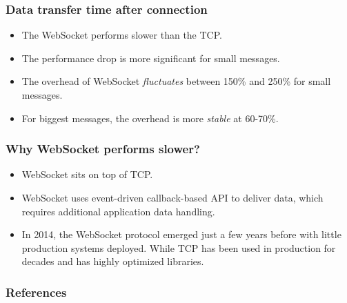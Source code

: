 \documentclass{beamer}
\begin{document}
\begin{frame}
    \frametitle{Data transfer time after connection}
    \begin{itemize}[<+->]
        \item The WebSocket performs slower than the TCP.
        \item The performance drop is more significant for small messages.
        \item The overhead of WebSocket \textit{fluctuates} between 150\% and 250\% for small
              messages.
        \item For biggest messages, the overhead is more \textit{stable} at 60-70\%.
    \end{itemize}
\end{frame}

\begin{frame}
    \frametitle{Why WebSocket performs slower?}
    \begin{itemize}[<+->]
        \item WebSocket sits on top of TCP.
        \item WebSocket uses event-driven callback-based API to deliver data, which requires
              additional application data handling.
        \item In 2014, the WebSocket protocol emerged just a few years before with little
              production systems deployed. While TCP has been used in production for
              decades and has highly optimized libraries.
    \end{itemize}
\end{frame}

\begin{frame}
    \nocite{*}
    \frametitle{References}
    
    
\end{frame}
\end{document}
